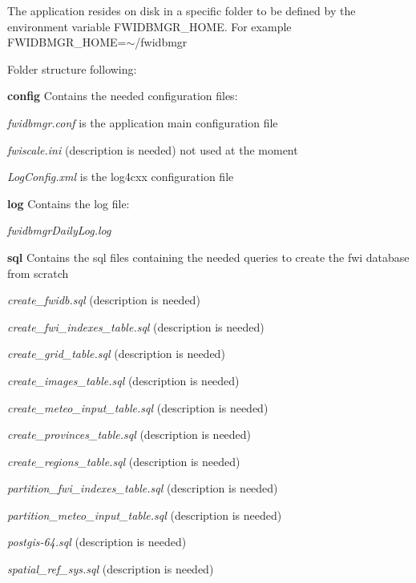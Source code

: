The application resides on disk in a specific folder to be defined by the environment variable {\ttfamily F\-W\-I\-D\-B\-M\-G\-R\-\_\-\-H\-O\-M\-E}. For example {\ttfamily F\-W\-I\-D\-B\-M\-G\-R\-\_\-\-H\-O\-M\-E=$\sim$/fwidbmgr}

Folder structure following\-:

{\bfseries config} Contains the needed configuration files\-:
\begin{DoxyItemize}
\item {\itshape fwidbmgr.\-conf} is the application main configuration file
\item {\itshape fwiscale.\-ini} (description is needed) not used at the moment
\item {\itshape Log\-Config.\-xml} is the log4cxx configuration file
\end{DoxyItemize}

{\bfseries log} Contains the log file\-:
\begin{DoxyItemize}
\item {\itshape fwidbmgr\-Daily\-Log.\-log}
\end{DoxyItemize}

{\bfseries sql} Contains the sql files containing the needed queries to create the fwi database from scratch
\begin{DoxyItemize}
\item {\itshape create\-\_\-fwidb.\-sql} (description is needed)
\item {\itshape create\-\_\-fwi\-\_\-indexes\-\_\-table.\-sql} (description is needed)
\item {\itshape create\-\_\-grid\-\_\-table.\-sql} (description is needed)
\item {\itshape create\-\_\-images\-\_\-table.\-sql} (description is needed)
\item {\itshape create\-\_\-meteo\-\_\-input\-\_\-table.\-sql} (description is needed)
\item {\itshape create\-\_\-provinces\-\_\-table.\-sql} (description is needed)
\item {\itshape create\-\_\-regions\-\_\-table.\-sql} (description is needed)
\item {\itshape partition\-\_\-fwi\-\_\-indexes\-\_\-table.\-sql} (description is needed)
\item {\itshape partition\-\_\-meteo\-\_\-input\-\_\-table.\-sql} (description is needed)
\item {\itshape postgis-\/64.\-sql} (description is needed)
\item {\itshape spatial\-\_\-ref\-\_\-sys.\-sql} (description is needed) 
\end{DoxyItemize}